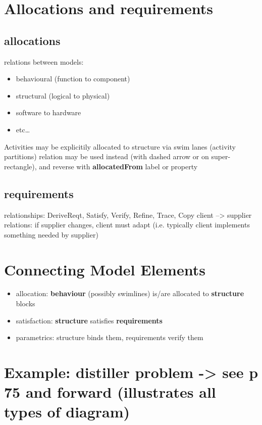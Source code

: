 \documentclass[11pt]{article}
\begin{document}
\section{Allocations and requirements}
\label{sec:org1566c9f}
\subsection{allocations}
\label{sec:org5baac11}
relations between models:
\begin{itemize}
\item behavioural (function to component)
\item structural (logical to physical)
\item software to hardware
\item etc\ldots{}
\end{itemize}
Activities may be explicitily allocated to structure via swim lanes (activity partitions)
\label{org3669108} relation may be used instead (with dashed arrow or on
super-rectangle), and reverse with \textbf{\textbf{allocatedFrom}} label or property
\subsection{requirements}
\label{sec:org8af952a}
relationships: DeriveReqt, Satisfy, Verify, Refine, Trace, Copy
client --> supplier relations: if supplier changes, client must adapt
(i.e. typically client implements something needed by supplier)
\section{Connecting Model Elements}
\label{sec:org282e496}
\begin{itemize}
\item allocation: \textbf{behaviour} (possibly swimlines) is/are allocated to \textbf{structure} blocks
\item satisfaction: \textbf{structure} satisfies \textbf{requirements}
\item parametrics: structure binds them, requirements verify them
\end{itemize}
\section{Example: distiller problem -> see p 75 and forward (illustrates all types of diagram)}
\label{sec:orgbc5796d}
\end{document}
